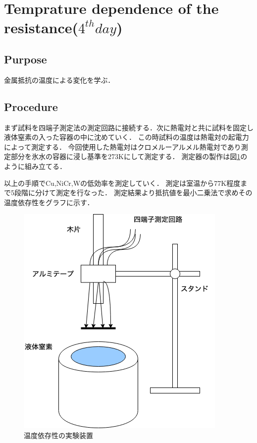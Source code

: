 \documentclass[11pt, a4paper,twocolumn]{jarticle}
\begin{document}
\section{Temprature dependence of the resistance($4^{th} day$)}

\subsection{Purpose}
金属抵抗の温度による変化を学ぶ．
\subsection{Procedure}
まず試料を四端子測定法の測定回路に接続する．次に熱電対と共に試料を固定し液体窒素の入った容器の中に沈めていく．
この時試料の温度は熱電対の起電力によって測定する．
今回使用した熱電対はクロメルーアルメル熱電対であり測定部分を氷水の容器に浸し基準を273Kにして測定する．
測定器の製作は図\ref{fig:29}のように組み立てる．

以上の手順でCu,NiCr,Wの低効率を測定していく．
測定は室温から77K程度まで5段階に分けて測定を行なった．
測定結果より抵抗値を最小二乗法で求めその温度依存性をグラフに示す．

\begin{figure}[htbp]
 \begin{center}
  \includegraphics[width=0.8\linewidth]{fig29.png}
 \end{center}
 \caption{温度依存性の実験装置}
 \label{fig:29}
\end{figure}
\end{document}
